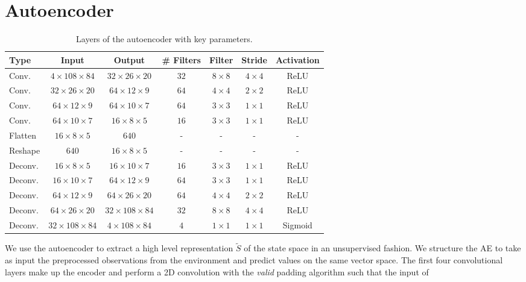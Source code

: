 \section{Autoencoder}\label{s:ae_training_details}
%
\begin{table}
    \centering
    \begin{tabular}{l c c c c c c} 
	\hline
	Type & Input & Output & \# Filters & Filter & Stride & Activation \\ 
	\hline 
	Conv. & $4 \times 108 \times 84$ & $32 \times 26 \times 20$ & $32$ & $8 \times 8$ & $4 \times 4$ & ReLU \\ 
	Conv. & $32 \times 26 \times 20$ & $64 \times 12 \times 9$ & $64$ & $4 \times 4$ & $2 \times 2$ & ReLU \\ 
	Conv. & $64 \times 12 \times 9$ & $64 \times 10 \times 7$ & $64$ & $3 \times 3$ & $1 \times 1$ & ReLU \\ 
	Conv. & $64 \times 10 \times 7$ & $16 \times 8 \times 5$ & $16$ & $3 \times 3$ & $1 \times 1$ & ReLU \\ 
	Flatten	& $16 \times 8 \times 5$ & $640$ & - & - & - & - \\ 
	\hline
	Reshape & $640$ & $16 \times 8 \times 5$ & - & - & - & - \\
	Deconv. & $16 \times 8 \times 5$ & $16 \times 10 \times 7$ & $16$ & $3 \times 3$ & $1 \times 1$ & ReLU \\ 
	Deconv. & $16 \times 10 \times 7$ & $64 \times 12 \times 9$ & $64$ & $3 \times 3$ & $1 \times 1$ & ReLU \\
	Deconv. & $64 \times 12 \times 9$ & $64 \times 26 \times 20$ & $64$ & $4 \times 4$ & $2 \times 2$ & ReLU \\
	Deconv. & $64 \times 26 \times 20$ & $32 \times 108 \times 84$ & $32$ & $8 \times 8$ & $4 \times 4$ & ReLU \\
	Deconv. & $32 \times 108 \times 84$ & $4 \times 108 \times 84$ & $4$ & $1 \times 1$ & $1 \times 1$ & Sigmoid \\
	\hline
    \end{tabular}
    \caption{Layers of the autoencoder with key parameters.}
    \label{t:AE_structure}
\end{table}
%
We use the autoencoder to extract a high level representation $\tilde{S}$ of the
state space in an unsupervised fashion.
We structure the AE to take as input the preprocessed observations from the
environment and predict values on the same vector space.
The first four convolutional layers make up the encoder and perform a 2D 
convolution with the \textit{valid} padding algorithm such that the input of 
